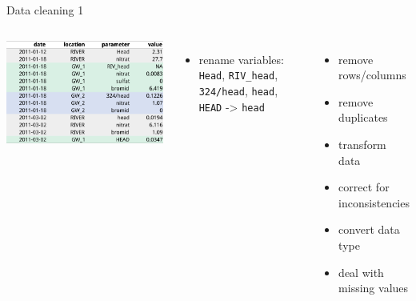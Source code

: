 \documentclass[9pt,ignorenonframetext,]{beamer}
\newenvironment{Shaded}{\begin{snugshade}}{\end{snugshade}}
\newcommand{\KeywordTok}[1]{\textcolor[rgb]{0.13,0.29,0.53}{\textbf{{#1}}}}
\newcommand{\StringTok}[1]{\textcolor[rgb]{0.31,0.60,0.02}{{#1}}}
\newcommand{\NormalTok}[1]{{#1}}
\providecommand{\tightlist}{%
  \setlength{\itemsep}{0pt}\setlength{\parskip}{0pt}}
\newcommand{\columnsbegin}{\begin{columns}}
\newcommand{\columnsend}{\end{columns}}
\begin{document}
\begin{frame}[fragile]{Data cleaning 1}

\columnsbegin


\includegraphics{imgPres/data_tidying_table_messy_bad.png}

\begin{itemize}
\item
  rename variables: \texttt{Head}, \texttt{RIV\_head},
  \texttt{324/head}, \texttt{head}, \texttt{HEAD} -\textgreater{}
  \texttt{head}

\begin{Shaded}
\end{Shaded}
\end{itemize}


\begin{itemize}
\tightlist
\item
  remove rows/columns
\item
  remove duplicates
\item
  transform data
\item
  correct for inconsistencies
\item
  convert data type
\item
  deal with missing values
\end{itemize}

\columnsend

\end{frame}
\end{document}
